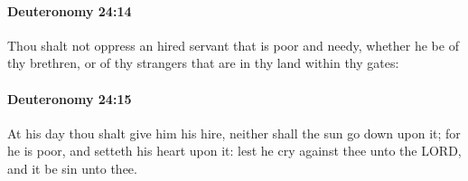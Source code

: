 		\paragraph{Deuteronomy 24:14} %
			\label{DEUTERONOMY-24-14}

			Thou shalt not oppress an hired servant that is poor and needy, whether he be of thy brethren, or of thy strangers that are in thy land within thy gates:


		\paragraph{Deuteronomy 24:15} %
			\label{DEUTERONOMY-24-15}

			At his day thou shalt give him his hire, neither shall the sun go down upon it; for he is poor, and setteth his heart upon it: lest he cry against thee unto the LORD, and it be sin unto thee.

